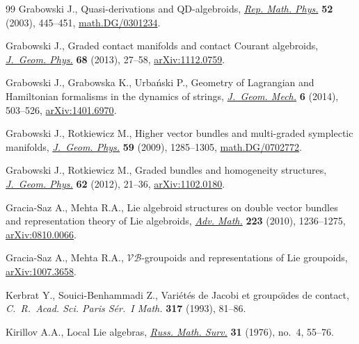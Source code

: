 \documentclass[10pt,a4paper]{amsart}
\numberwithin{equation}{section}
\begin{document}
\begin{thebibliography}{99}
Grabowski J., Quasi-derivations and {QD}-algebroids, \href{http://dx.doi.org/10.1016/S0034-4877(03)80041-1}{\textit{Rep. Math. Phys.}}
  \textbf{52} (2003), 445--451, \href{http://arxiv.org/abs/math.DG/0301234}{math.DG/0301234}.

Grabowski J., Graded contact manifolds and contact {C}ourant algebroids,
  \href{http://dx.doi.org/10.1016/j.geomphys.2013.02.001}{\textit{J.~Geom. Phys.}} \textbf{68} (2013), 27--58, \href{http://arxiv.org/abs/1112.0759}{arXiv:1112.0759}.

Grabowski J., Grabowska K., Urba{\'n}ski P., Geometry of {L}agrangian and
  {H}amiltonian formalisms in the dynamics of strings, \href{http://dx.doi.org/10.3934/jgm.2014.6.503}{\textit{J.~Geom. Mech.}}
  \textbf{6} (2014), 503--526, \href{http://arxiv.org/abs/1401.6970}{arXiv:1401.6970}.

Grabowski J., Rotkiewicz M., Higher vector bundles and multi-graded symplectic
  manifolds, \href{http://dx.doi.org/10.1016/j.geomphys.2009.06.009}{\textit{J.~Geom. Phys.}} \textbf{59} (2009), 1285--1305,
  \href{http://arxiv.org/abs/math.DG/0702772}{math.DG/0702772}.

Grabowski J., Rotkiewicz M., Graded bundles and homogeneity structures,
  \href{http://dx.doi.org/10.1016/j.geomphys.2011.09.004}{\textit{J.~Geom. Phys.}} \textbf{62} (2012), 21--36, \href{http://arxiv.org/abs/1102.0180}{arXiv:1102.0180}.

Gracia-Saz A., Mehta R.A., Lie algebroid structures on double vector bundles
  and representation theory of {L}ie algebroids, \href{http://dx.doi.org/10.1016/j.aim.2009.09.010}{\textit{Adv. Math.}}
  \textbf{223} (2010), 1236--1275, \href{http://arxiv.org/abs/0810.0066}{arXiv:0810.0066}.

Gracia-Saz A., Mehta R.A., $\mathcal{VB}$-groupoids and representations of Lie
  groupoids, \href{http://arxiv.org/abs/1007.3658}{arXiv:1007.3658}.



Kerbrat Y., Souici-Benhammadi Z., Vari\'et\'es de {J}acobi et groupo\"\i des de
  contact, \textit{C.~R.~Acad. Sci. Paris S\'er.~I Math.} \textbf{317} (1993),
  81--86.

Kirillov A.A., Local {L}ie algebras, \href{http://dx.doi.org/10.1070/RM1976v031n04ABEH001556}{\textit{Russ. Math. Surv.}} \textbf{31}
  (1976), no.~4, 55--76.


\end{thebibliography}
\end{document}
